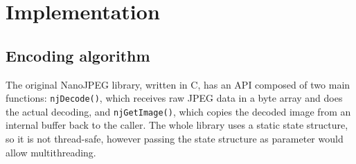 


\lstset{style=mystyle}

\chapter{Implementation} \label{implementation}

\section{Encoding algorithm}
The original NanoJPEG library, written in C, has an API composed of two main functions: \texttt{njDecode()}, which receives raw JPEG data in a byte array and does the actual decoding, and \texttt{njGetImage()}, which copies the decoded image from an internal buffer back to the caller. The whole library uses a static state structure, so it is not thread-safe, however passing the state structure as parameter would allow multithreading.


